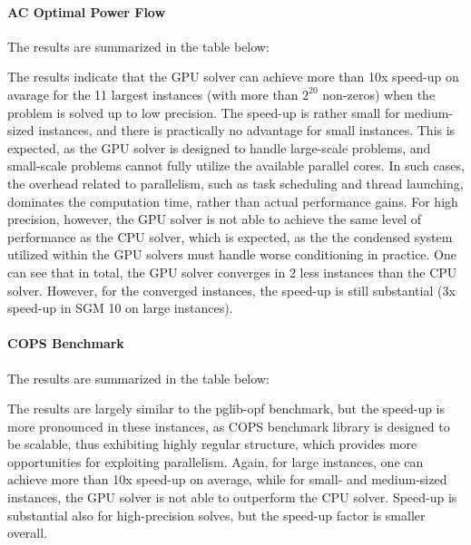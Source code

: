 \documentclass{article}
\begin{document}
\paragraph{AC Optimal Power Flow}
The results are summarized in the table below:
\begin{center}
  \footnotesize
  
\end{center}
The results indicate that the GPU solver can achieve more than 10x speed-up on avarage for the 11 largest instances (with more than $2^{20}$ non-zeros) when the problem is solved up to low precision.
The speed-up is rather small for medium-sized instances, and there is practically no advantage for small instances.
This is expected, as the GPU solver is designed to handle large-scale problems, and small-scale problems cannot fully utilize the available parallel cores.
In such cases, the overhead related to parallelism, such as task scheduling and thread launching, dominates the computation time, rather than actual performance gains.
For high precision, however, the GPU solver is not able to achieve the same level of performance as the CPU solver, which is expected, as the the condensed system utilized within the GPU solvers must handle worse conditioning in practice.
One can see that in total, the GPU solver converges in 2 less instances than the CPU solver.
However, for the converged instances, the speed-up is still substantial (3x speed-up in SGM 10 on large instances).


\paragraph{COPS Benchmark}
The results are summarized in the table below:
\begin{center}
  \footnotesize
  
\end{center}
The results are largely similar to the pglib-opf benchmark, but the speed-up is more pronounced in these instances, as COPS benchmark library is designed to be scalable, thus exhibiting highly regular structure, which provides more opportunities for exploiting parallelism.
Again, for large instances, one can achieve more than 10x speed-up on average, while for small- and medium-sized instances, the GPU solver is not able to outperform the CPU solver.
Speed-up is substantial also for high-precision solves, but the speed-up factor is smaller overall.
\end{document}
